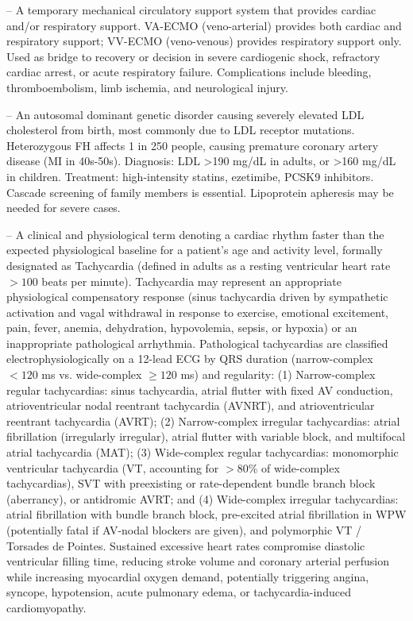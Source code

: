 -- A temporary mechanical circulatory support system that provides cardiac and/or respiratory support. VA-ECMO (veno-arterial) provides both cardiac and respiratory support; VV-ECMO (veno-venous) provides respiratory support only. Used as bridge to recovery or decision in severe cardiogenic shock, refractory cardiac arrest, or acute respiratory failure. Complications include bleeding, thromboembolism, limb ischemia, and neurological injury.

-- An autosomal dominant genetic disorder causing severely elevated LDL cholesterol from birth, most commonly due to LDL receptor mutations. Heterozygous FH affects 1 in 250 people, causing premature coronary artery disease (MI in 40s-50s). Diagnosis: LDL >190 mg/dL in adults, or >160 mg/dL in children. Treatment: high-intensity statins, ezetimibe, PCSK9 inhibitors. Cascade screening of family members is essential. Lipoprotein apheresis may be needed for severe cases.

-- A clinical and physiological term denoting a cardiac rhythm faster than the expected physiological baseline for a patient's age and activity level, formally designated as Tachycardia (defined in adults as a resting ventricular heart rate $>100$ beats per minute). Tachycardia may represent an appropriate physiological compensatory response (sinus tachycardia driven by sympathetic activation and vagal withdrawal in response to exercise, emotional excitement, pain, fever, anemia, dehydration, hypovolemia, sepsis, or hypoxia) or an inappropriate pathological arrhythmia. Pathological tachycardias are classified electrophysiologically on a 12-lead ECG by QRS duration (narrow-complex $<120$ ms vs. wide-complex $\ge 120$ ms) and regularity: (1) Narrow-complex regular tachycardias: sinus tachycardia, atrial flutter with fixed AV conduction, atrioventricular nodal reentrant tachycardia (AVNRT), and atrioventricular reentrant tachycardia (AVRT); (2) Narrow-complex irregular tachycardias: atrial fibrillation (irregularly irregular), atrial flutter with variable block, and multifocal atrial tachycardia (MAT); (3) Wide-complex regular tachycardias: monomorphic ventricular tachycardia (VT, accounting for $>80\%$ of wide-complex tachycardias), SVT with preexisting or rate-dependent bundle branch block (aberrancy), or antidromic AVRT; and (4) Wide-complex irregular tachycardias: atrial fibrillation with bundle branch block, pre-excited atrial fibrillation in WPW (potentially fatal if AV-nodal blockers are given), and polymorphic VT / Torsades de Pointes. Sustained excessive heart rates compromise diastolic ventricular filling time, reducing stroke volume and coronary arterial perfusion while increasing myocardial oxygen demand, potentially triggering angina, syncope, hypotension, acute pulmonary edema, or tachycardia-induced cardiomyopathy.

